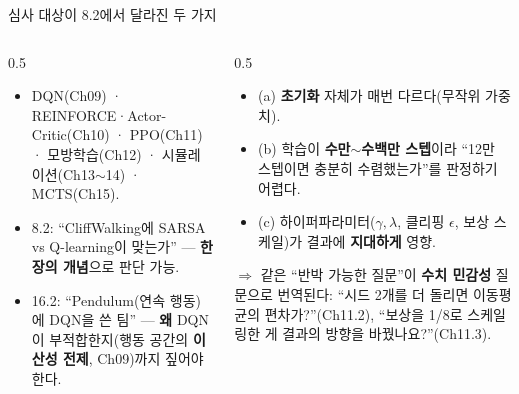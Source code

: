 \documentclass[aspectratio=169,11pt]{beamer}
\begin{document}
\begin{frame}{심사 대상이 8.2에서 달라진 두 가지}
  \begin{columns}[T]
    \begin{column}{0.5\textwidth}
      \begin{itemize}
        \item DQN(Ch09) · REINFORCE·Actor-Critic(Ch10) · PPO(Ch11) ·
          모방학습(Ch12) · 시뮬레이션(Ch13$\sim$14) · MCTS(Ch15).
        \item 8.2: ``CliffWalking에 SARSA vs Q-learning이 맞는가'' —
          \textbf{한 장의 개념}으로 판단 가능.
        \item 16.2: ``Pendulum(연속 행동)에 DQN을 쓴 팀'' — \textbf{왜} DQN이
          부적합한지(행동 공간의 \textbf{이산성 전제}, Ch09)까지 짚어야
          한다.
      \end{itemize}
    \end{column}
    \begin{column}{0.5\textwidth}
      \begin{itemize}
        \item (a) \textbf{초기화} 자체가 매번 다르다(무작위 가중치).
        \item (b) 학습이 \textbf{수만$\sim$수백만 스텝}이라 ``12만 스텝이면
          충분히 수렴했는가''를 판정하기 어렵다.
        \item (c) 하이퍼파라미터($\gamma, \lambda$, 클리핑 $\epsilon$, 보상
          스케일)가 결과에 \textbf{지대하게} 영향.
      \end{itemize}
      $\Rightarrow$ 같은 ``반박 가능한 질문''이 \textbf{수치 민감성} 질문으로
      번역된다: ``시드 2개를 더 돌리면 이동평균의 편차가?''(Ch11.2),
      ``보상을 1/8로 스케일링한 게 결과의 방향을 바꿨나요?''(Ch11.3).
    \end{column}
  \end{columns}
\end{frame}
\end{document}
